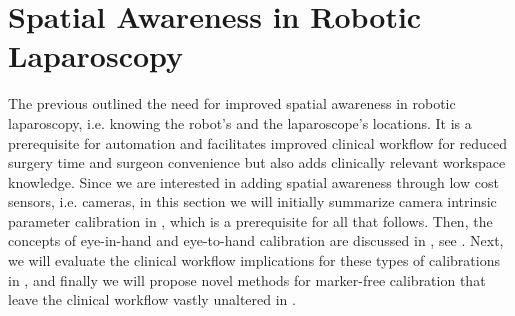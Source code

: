 











\section{Spatial Awareness in Robotic Laparoscopy}
\label{in:sec:spatial_awareness_in_robotic_laparoscopy} 

The previous  outlined the need for improved spatial awareness in robotic laparoscopy, i.e. knowing the robot's and the laparoscope's locations. It is a prerequisite for automation and facilitates improved clinical workflow for reduced surgery time and surgeon convenience but also adds clinically relevant workspace knowledge. Since we are interested in adding spatial awareness through low cost sensors, i.e. cameras, in this section we will initially summarize camera intrinsic parameter calibration in , which is a prerequisite for all that follows. Then, the concepts of eye-in-hand and eye-to-hand calibration are discussed in , see . Next, we will evaluate the clinical workflow implications for these types of calibrations in , and finally we will propose novel methods for marker-free calibration that leave the clinical workflow vastly unaltered in .
\label{in:sec:eye_in_to_hand}

